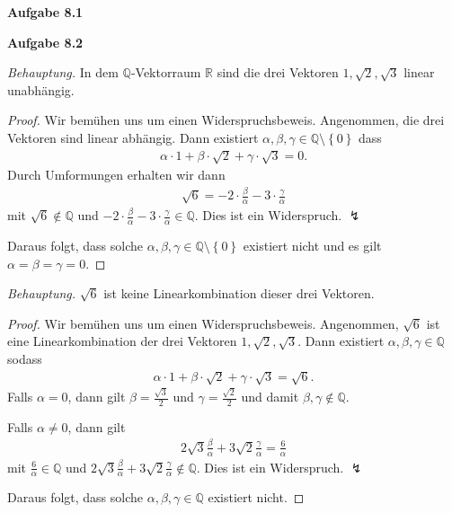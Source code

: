 \documentclass[12pt]{extarticle}
\newcommand{\mg}[1]{\mathbb{#1}}
\begin{document}
\textbf{Aufgabe 8.1}

\textbf{Aufgabe 8.2}

\textit{Behauptung.}  In dem \(\mg{Q}\)-Vektorraum
\(\mg{R}\) sind die drei Vektoren \(1, \sqrt{2}, \sqrt{3}\)
linear unabhängig.

\begin{proof}
  Wir bemühen uns um einen Widerspruchsbeweis.
  Angenommen, die drei Vektoren sind linear abhängig.
  Dann existiert $\alpha, \beta, \gamma \in \mg{Q}
  \setminus \left\{ 0 \right\}$ dass
\begin{align*}
\alpha \cdot 1 + \beta \cdot \sqrt{2} + \gamma \cdot
  \sqrt{3} = 0.
\end{align*}
Durch Umformungen erhalten wir dann
\begin{align*}
  \sqrt{6} =
  -2 \cdot \frac{\beta}{\alpha} - 3 \cdot \frac{\gamma}{\alpha}
\end{align*} mit \(\sqrt{6} \notin \mg{Q}\) und $-2 \cdot
\frac{\beta}{\alpha} - 3 \cdot \frac{\gamma}{\alpha}
\in \mg{Q}$.  Dies ist ein Widerspruch. \(\lightning\)

Daraus folgt, dass solche  $\alpha, \beta, \gamma \in \mg{Q}
\setminus \left\{ 0 \right\}$  existiert nicht und es
gilt \(\alpha = \beta = \gamma = 0\).
\end{proof}

\textit{Behauptung.}  \(\sqrt{6}\) ist keine
Linearkombination dieser drei Vektoren.

\begin{proof}
  Wir bemühen uns um einen Widerspruchsbeweis.
  Angenommen, \(\sqrt{6}\) ist eine Linearkombination der
  drei Vektoren \(1, \sqrt{2}, \sqrt{3}\). Dann existiert
  \(\alpha, \beta, \gamma \in \mg{Q}\) sodass
\begin{align*}
\alpha \cdot 1 + \beta \cdot \sqrt{2} +
  \gamma \cdot \sqrt{3} = \sqrt{6}.
\end{align*}
Falls \(\alpha=0\), dann gilt
\(\beta=\frac{\sqrt{3}}{2}\) und
\(\gamma=\frac{\sqrt{2}}{2}\) und damit $\beta,
\gamma \notin \mg{Q}$.

Falls \(\alpha \neq 0\), dann gilt
\begin{align*}
2 \sqrt{3} \frac{\beta}{\alpha} + 3 \sqrt{2}
  \frac{\gamma}{\alpha} = \frac{6}{\alpha}
\end{align*}
mit \(\frac{6}{\alpha} \in \mg{Q}\) und
$2 \sqrt{3} \frac{\beta}{\alpha} + 3 \sqrt{2}
\frac{\gamma}{\alpha} \notin \mg{Q}$.
Dies ist ein Widerspruch. \(\lightning\)

Daraus folgt, dass solche  \(\alpha, \beta, \gamma \in \mg{Q}\)  existiert nicht.
\end{proof}
\end{document}
